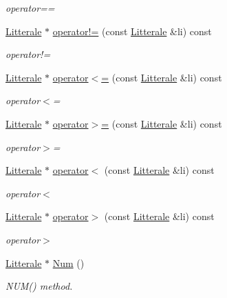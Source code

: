 \begin{DoxyCompactItemize}
\begin{DoxyCompactList}\small\item\em operator== \end{DoxyCompactList}\item 
\hyperlink{class_litterale}{Litterale} $\ast$ \hyperlink{class_li_expression_a109d27f2e3a8717a0cd391db8042f3d7}{operator!=} (const \hyperlink{class_litterale}{Litterale} \&li) const 
\begin{DoxyCompactList}\small\item\em operator!= \end{DoxyCompactList}\item 
\hyperlink{class_litterale}{Litterale} $\ast$ \hyperlink{class_li_expression_a2803c38127ed58e1d8148e06e079dbb4}{operator$<$=} (const \hyperlink{class_litterale}{Litterale} \&li) const 
\begin{DoxyCompactList}\small\item\em operator$<$= \end{DoxyCompactList}\item 
\hyperlink{class_litterale}{Litterale} $\ast$ \hyperlink{class_li_expression_a9559555748722ee6f1a384527fef29a1}{operator$>$=} (const \hyperlink{class_litterale}{Litterale} \&li) const 
\begin{DoxyCompactList}\small\item\em operator$>$= \end{DoxyCompactList}\item 
\hyperlink{class_litterale}{Litterale} $\ast$ \hyperlink{class_li_expression_aa0182e19cd3c065f7da2318fdbd261fe}{operator$<$} (const \hyperlink{class_litterale}{Litterale} \&li) const 
\begin{DoxyCompactList}\small\item\em operator$<$ \end{DoxyCompactList}\item 
\hyperlink{class_litterale}{Litterale} $\ast$ \hyperlink{class_li_expression_a31d73a19962932144004d181dd46a203}{operator$>$} (const \hyperlink{class_litterale}{Litterale} \&li) const 
\begin{DoxyCompactList}\small\item\em operator$>$ \end{DoxyCompactList}\item 
\hyperlink{class_litterale}{Litterale} $\ast$ \hyperlink{class_li_expression_aff040ab50e34119fc3ef87a3810857dd}{Num} ()
\begin{DoxyCompactList}\small\item\em N\+U\+M() method. \end{DoxyCompactList}\item 

\end{DoxyCompactItemize}
